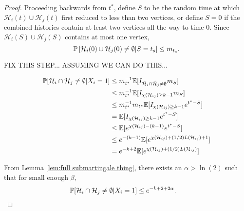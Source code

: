 \begin{proof}
	Proceeding backwards from $t^*$, define $S$ to be the random time at which $\mathcal{H}_i(t) \cup \mathcal{H}_j(t)$ first reduced to less than two vertices, or define $S = 0$ if the combined histories contain at least two vertices all the way to time $0$. Since $\mathcal{H}_i(S) \cup \mathcal{H}_j(S)$ contains at most one vertex,
	\begin{equation}
		\mathbb{P}\left[\mathcal{H}_i(0) \cup \mathcal{H}_j(0) \neq \emptyset | S = t_s\right] \leq m_{t_s}.
	\end{equation}

	FIX THIS STEP...  ASSUMING WE CAN DO THIS...

	\begin{align}
		\mathbb{P}[\mathcal{H}_i \cap \mathcal{H}_j \neq \emptyset | X_i = 1] &\leq m_{t^*}^{-1} \mathbb{E}[I_{\hat{\mathcal{H}}_i \cap \hat{\mathcal{H}}_j \neq \emptyset} m_S] \\
		&\leq m_{t^*}^{-1} \mathbb{E}[I_{\chi(\mathcal{H}_{ij}) \geq k-1} m_S]\\
		&\leq m_{t^*}^{-1} m_{t^*} \mathbb{E}[I_{\chi(\mathcal{H}_{ij}) \geq k-1} e^{t^* - S}]\\
		&= \mathbb{E}[I_{\chi(\mathcal{H}_{ij}) \geq k-1} e^{t^* - S}]\\
		&\leq \mathbb{E}[e^{\chi(\mathcal{H}_{ij}) - (k-1)} e^{t^* - S}]\\
		&\leq e^{-(k-1)} \mathbb{E}[e^{\chi(\mathcal{H}_{ij}) + (1/2)L(\mathcal{H}_{ij}) + 1} ]\\
		&= e^{-k + 2} \mathbb{E}[e^{\chi(\mathcal{H}_{ij}) + (1/2)L(\mathcal{H}_{ij})} ]
	\end{align}

	From Lemma \ref{lem:full submartingale thing}, there exists an $\alpha > \ln(2)$ such that for small enough $\beta$,
	\begin{align}
		\mathbb{P}[\mathcal{H}_i \cap \mathcal{H}_j \neq \emptyset | X_i = 1] &\leq e^{-k + 2 + 2\alpha}.
	\end{align}
\end{proof}

